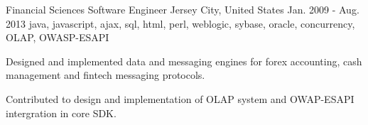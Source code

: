 \cventry
    {Financial Sciences} %
    {Software Engineer} %
    {Jersey City, United States} %
    {Jan. 2009 - Aug. 2013} %
    {java, javascript, ajax, sql, html, perl, weblogic, sybase, oracle, concurrency, OLAP, OWASP-ESAPI} %
    {
    \begin{cvitems} %
        \item { Designed and implemented data and messaging engines for forex accounting, cash management and fintech messaging protocols.}
        \item { Contributed to design and implementation of OLAP system and OWAP-ESAPI intergration in core SDK. }
    \end{cvitems}
    }
    